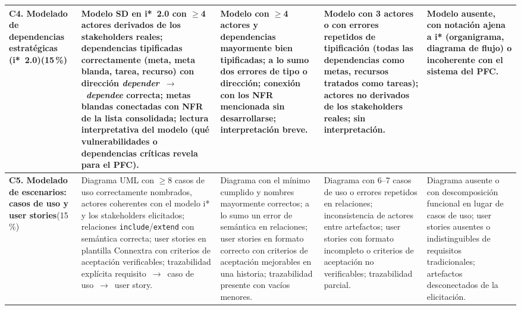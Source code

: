 \documentclass[11pt]{article}
\begin{document}
\begin{landscape}
{\begin{longtable}{|L{3.3cm}|L{4.75cm}|L{4.75cm}|L{4.75cm}|L{4.75cm}|}
\textbf{C4. Modelado de dependencias estratégicas (i*~2.0)}\newline{}(15\,\%) &
Modelo SD en i*~2.0 con $\geq$4 actores derivados de los stakeholders reales; dependencias tipificadas correctamente (meta, meta blanda, tarea, recurso) con dirección \textit{depender}~$\rightarrow$~\textit{dependee} correcta; metas blandas conectadas con NFR de la lista consolidada; lectura interpretativa del modelo (qué vulnerabilidades o dependencias críticas revela para el PFC). &
Modelo con $\geq$4 actores y dependencias mayormente bien tipificadas; a lo sumo dos errores de tipo o dirección; conexión con los NFR mencionada sin desarrollarse; interpretación breve. &
Modelo con 3 actores o con errores repetidos de tipificación (todas las dependencias como metas, recursos tratados como tareas); actores no derivados de los stakeholders reales; sin interpretación. &
Modelo ausente, con notación ajena a i* (organigrama, diagrama de flujo) o incoherente con el sistema del PFC.\\
\hline

\textbf{C5. Modelado de escenarios: casos de uso y user stories}\newline{}(15\,\%) &
Diagrama UML con $\geq$8 casos de uso correctamente nombrados, actores coherentes con el modelo i* y los stakeholders elicitados; relaciones \texttt{include}/\texttt{extend} con semántica correcta; user stories en plantilla Connextra con criterios de aceptación verificables; trazabilidad explícita requisito~$\rightarrow$~caso de uso~$\rightarrow$~user story. &
Diagrama con el mínimo cumplido y nombres mayormente correctos; a lo sumo un error de semántica en relaciones; user stories en formato correcto con criterios de aceptación mejorables en una historia; trazabilidad presente con vacíos menores. &
Diagrama con 6--7 casos de uso o errores repetidos en relaciones; inconsistencia de actores entre artefactos; user stories con formato incompleto o criterios de aceptación no verificables; trazabilidad parcial. &
Diagrama ausente o con descomposición funcional en lugar de casos de uso; user stories ausentes o indistinguibles de requisitos tradicionales; artefactos desconectados de la elicitación.\\
\hline


\end{longtable}}
\end{landscape}
\end{document}
